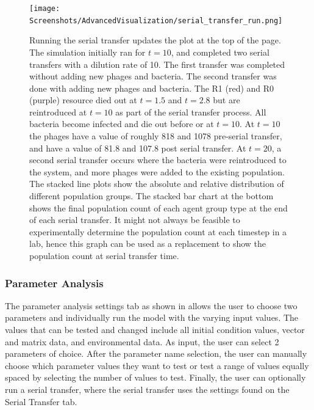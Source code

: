 \begin{figure}
    \centering
    \texttt{[image: Screenshots/AdvancedVisualization/serial\_transfer\_run.png]}
    \caption{
        Running the serial transfer updates the plot at the top of the page. 
        The simulation initially ran for $t=10$, and completed two serial transfers with a dilution rate of 10. 
        The first transfer was completed without adding new phages and bacteria. 
        The second transfer was done with adding new phages and bacteria. 
        The R1 (red) and R0 (purple) resource died out at $t=1.5$ and $t=2.8$ but are reintroduced at $t=10$ as part of the serial transfer process. 
        All bacteria become infected and die out before or at $t=10$. 
        At $t=10$ the phages have a value of roughly 818 and 1078 pre-serial transfer, and have a value of 81.8 and 107.8 post serial transfer. 
        At $t=20$, a second serial transfer occurs where the bacteria were reintroduced to the system, and more phages were added to the existing population. 
        The stacked line plots show the absolute and relative distribution of different population groups. 
        The stacked bar chart at the bottom shows the final population count of each agent group type at the end of each serial transfer. 
        It might not always be feasible to experimentally determine the population count at each timestep in a lab, hence this graph can be used as a replacement to show the population count at serial transfer time. 
    }
    \label{fig:ss:av:serial_transfer_run}
\end{figure}

\subsubsection{Parameter Analysis}
The parameter analysis settings tab as shown in  allows the user to choose two parameters and individually run the model with the varying input values. 
The values that can be tested and changed include all initial condition values, vector and matrix data, and environmental data. 
As input, the user can select 2 parameters of choice. 
After the parameter name selection, the user can manually choose which parameter values they want to test or test a range of values equally spaced by selecting the number of values to test. 
Finally, the user can optionally run a serial transfer, where the serial transfer uses the settings found on the Serial Transfer tab. \newline 

